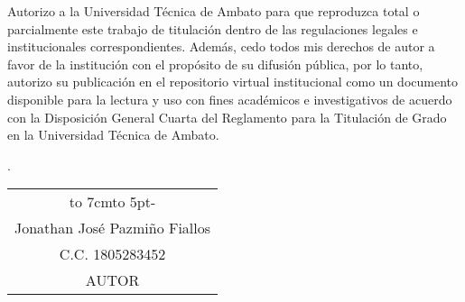 \newpage
{}
Autorizo a la Universidad Técnica de Ambato para que reproduzca total o parcialmente
este trabajo de titulación dentro de las regulaciones legales e institucionales
correspondientes. Además, cedo todos mis derechos de autor a favor de la institución
con el propósito de su difusión pública, por lo tanto, autorizo su publicación en el
repositorio virtual institucional como un documento disponible para la lectura y uso
con fines académicos e investigativos de acuerdo con la Disposición General Cuarta
del Reglamento para la Titulación de Grado en la Universidad Técnica de Ambato.
\begin{flushright}
	\lugarFechaPrelims.
\end{flushright}

\vspace*{5cm}
\begin{center}
	\begin{tabular}{c}
		\hbox to 7cm{\leaders\hbox to 5pt{\hss - \hss}\hfil} \\
		Jonathan José Pazmiño Fiallos                        \\
		C.C. 1805283452                                      \\
		AUTOR
	\end{tabular}
\end{center}
